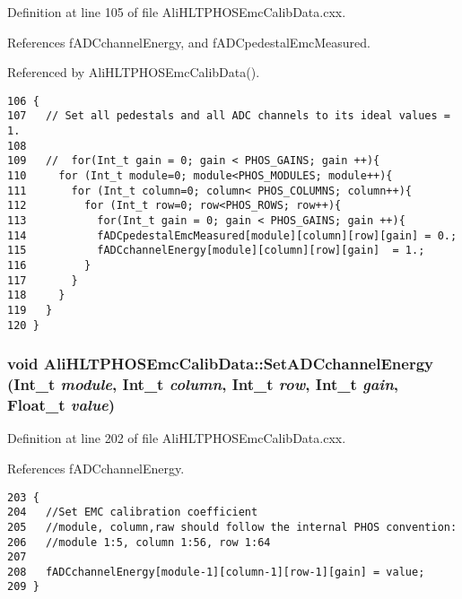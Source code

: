 Definition at line 105 of file Ali\-HLTPHOSEmc\-Calib\-Data.cxx.

References f\-ADCchannel\-Energy, and f\-ADCpedestal\-Emc\-Measured.

Referenced by Ali\-HLTPHOSEmc\-Calib\-Data().

\footnotesize\begin{verbatim}106 {
107   // Set all pedestals and all ADC channels to its ideal values = 1.
108 
109   //  for(Int_t gain = 0; gain < PHOS_GAINS; gain ++){
110     for (Int_t module=0; module<PHOS_MODULES; module++){
111       for (Int_t column=0; column< PHOS_COLUMNS; column++){
112         for (Int_t row=0; row<PHOS_ROWS; row++){
113           for(Int_t gain = 0; gain < PHOS_GAINS; gain ++){
114           fADCpedestalEmcMeasured[module][column][row][gain] = 0.;
115           fADCchannelEnergy[module][column][row][gain]  = 1.;
116         }
117       }
118     }
119   }
120 }
\end{verbatim}\normalsize 


\subsubsection{\setlength{\rightskip}{0pt plus 5cm}void Ali\-HLTPHOSEmc\-Calib\-Data::Set\-ADCchannel\-Energy (Int\_\-t {\em module}, Int\_\-t {\em column}, Int\_\-t {\em row}, Int\_\-t {\em gain}, Float\_\-t {\em value})}\label{classAliHLTPHOSEmcCalibData_AliHLTPHOSEmcCalibDataa9}




Definition at line 202 of file Ali\-HLTPHOSEmc\-Calib\-Data.cxx.

References f\-ADCchannel\-Energy.

\footnotesize\begin{verbatim}203 {
204   //Set EMC calibration coefficient
205   //module, column,raw should follow the internal PHOS convention:
206   //module 1:5, column 1:56, row 1:64
207 
208   fADCchannelEnergy[module-1][column-1][row-1][gain] = value;
209 }
\end{verbatim}\normalsize 


